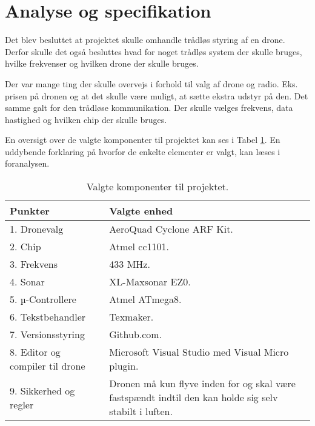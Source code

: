 \documentclass[Main]{subfiles}
\begin{document}
\section{Analyse og specifikation}
Det blev besluttet at projektet skulle omhandle trådløs styring af en drone. 
Derfor skulle det også besluttes hvad for noget trådløs system der skulle bruges, hvilke frekvenser og hvilken drone der skulle bruges.

Der var mange ting der skulle overvejs i forhold til valg af drone og radio.
Eks. prisen på dronen og at det skulle være muligt, at sætte ekstra udstyr på den.
Det samme galt for den trådløse kommunikation. 
Der skulle vælges frekvens, data hastighed og hvilken chip der skulle bruges.

En oversigt over de valgte komponenter til projektet kan ses i Tabel \ref{Tab:komponentliste}.
En uddybende forklaring på hvorfor de enkelte elementer er valgt, kan læses i 
foranalysen\cite[s. 5 -- 13]{Foranalyse}.

\begin{table}[H]
	\begin{tabular}{p{} p{}}
	\hline
	Punkter & Valgte enhed \\ \hline
	1. Dronevalg & AeroQuad Cyclone ARF Kit. \\
	2. Chip & Atmel cc1101.\\
	3. Frekvens & 433 MHz.\\
	4. Sonar & XL-Maxsonar EZ0.\\
	5. µ-Controllere & Atmel ATmega8.\\
	6. Tekstbehandler & Texmaker.\\
	7. Versionsstyring & Github.com.\\
	8. Editor og compiler til drone & Microsoft Visual Studio med Visual Micro plugin.\\
	9. Sikkerhed og regler & Dronen må kun flyve inden for og skal være fastspændt indtil den kan holde sig selv stabilt i luften.\\ \hline
	\end{tabular}

\caption{Valgte komponenter til projektet.}
\label{Tab:komponentliste}
\end{table}
\end{document}
